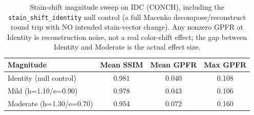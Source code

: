 \begin{table}[t]
\centering
\caption{Stain-shift magnitude sweep on IDC (CONCH), including the \texttt{stain\_shift\_identity} null control (a full Macenko decompose/reconstruct round trip with NO intended stain-vector change). Any nonzero GPFR at Identity is reconstruction noise, not a real color-shift effect; the gap between Identity and Moderate is the actual effect size.}
\label{tab:stain_sweep}
\begin{tabular}{lccc}
\toprule
Magnitude & Mean SSIM & Mean GPFR & Max GPFR \\
\midrule
Identity (null control) & 0.981 & 0.040 & 0.108 \\
Mild (h=1.10/e=0.90) & 0.978 & 0.043 & 0.106 \\
Moderate (h=1.30/e=0.70) & 0.954 & 0.072 & 0.160 \\
\bottomrule
\end{tabular}
\end{table}
